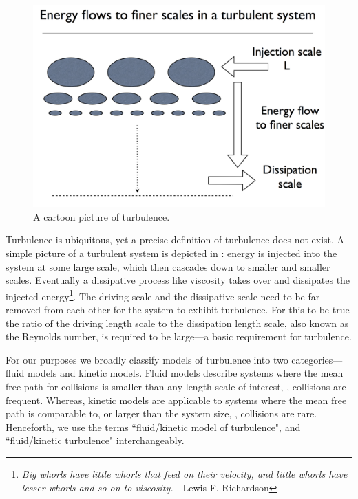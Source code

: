     
    \begin{figure}
    \begin{center}
        \includegraphics[width=14.8cm]{figs/intro/turbcartoon.png}
        \caption{A cartoon picture of turbulence.}
        \label{intro:fig:turbcartoon}
    \end{center}
    \end{figure}
    Turbulence is ubiquitous, yet a precise definition of turbulence does not exist. 
	A simple picture of
	a turbulent system is depicted in : energy is injected
	into the system at some large scale, which then cascades down to smaller and smaller
	scales. Eventually a dissipative process
	like viscosity takes over and dissipates the injected energy\footnote{\textit{Big whorls have
    little whorls that feed on their velocity, and little whorls have lesser whorls and so
    on to viscosity.}---Lewis F. Richardson}. The driving scale and
	the dissipative scale need to be far removed from each other for the system to exhibit
	turbulence. For this to be true the ratio of the driving length scale to the
	dissipation length scale, also known as the Reynolds number, is required to be large---a
    basic requirement for turbulence.

    For our purposes we broadly classify models of turbulence into two categories---fluid
    models and kinetic models. Fluid models describe systems where the mean
    free path for collisions is smaller than any length scale of interest, \ie,
    collisions are frequent. Whereas, kinetic models are applicable to systems where the
    mean free path is comparable to, or larger than the system size, \ie, collisions are
    rare. Henceforth, we use the terms ``fluid/kinetic model of
    turbulence", and ``fluid/kinetic turbulence" interchangeably.
    
